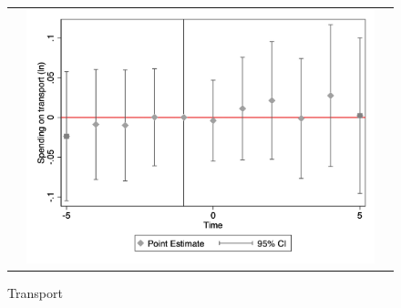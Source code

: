 \begin{figure}[ht]
\begin{tabular}{@{}ccc@{}}
\begin{minipage}[t]{0.32\textwidth}
            \label{fig:sport}
        \end{minipage} &
        \begin{minipage}[t]{0.32\textwidth}
            \centering
            \caption{Transport}
            \includegraphics[width=\linewidth]{images/eventdd_ln_q4_08_step1.jpg}
            \label{fig:transport}
        \end{minipage} \\[10pt]


\end{tabular}
\end{figure}
